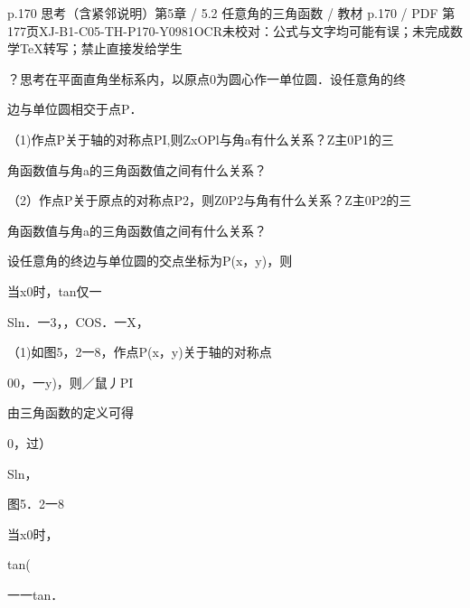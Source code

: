 \begin{bankitem}{p.170 思考（含紧邻说明）}{第5章 / 5.2 任意角的三角函数 / 教材 p.170 / PDF 第177页}{XJ-B1-C05-TH-P170-Y0981}{OCR未校对：公式与文字均可能有误；未完成数学TeX转写；禁止直接发给学生}
\begin{ocrdraft}
\par
？思考在平面直角坐标系内，以原点0为圆心作一单位圆．设任意角的终
\par
边与单位圆相交于点P．
\par
（1)作点P关于轴的对称点PI,则ZxOPl与角a有什么关系？Z主0P1的三
\par
角函数值与角a的三角函数值之间有什么关系？
\par
（2）作点P关于原点的对称点P2，则Z0P2与角有什么关系？Z主0P2的三
\par
角函数值与角a的三角函数值之间有什么关系？
\par
设任意角的终边与单位圆的交点坐标为P(x，y)，则
\par
当x0时，tan仅一
\par
Sln．一3，，COS．一X，
\par
（1)如图5，2一8，作点P(x，y)关于轴的对称点
\par
00，一y)，则／鼠丿PI
\par
由三角函数的定义可得
\par
0，过）
\par
Sln，
\par
图5．2一8
\par
当x0时，
\par
tan(
\par
一一tan．
\end{ocrdraft}
\end{bankitem}
